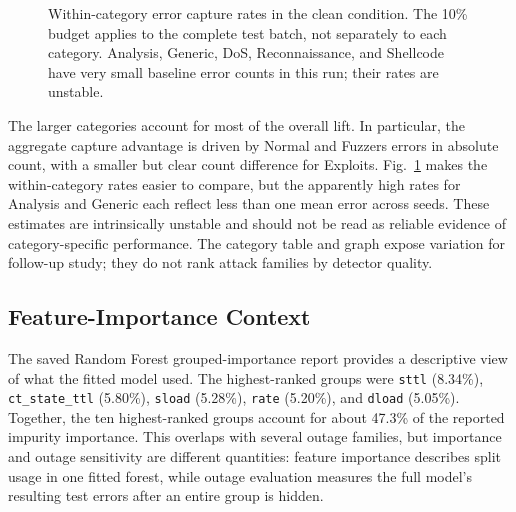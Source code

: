 \documentclass[conference]{IEEEtran}
\begin{document}
\begin{figure}[t]
\centering
{}
\caption{Within-category error capture rates in the clean condition. The 10\% budget applies to the complete test batch, not separately to each category. Analysis, Generic, DoS, Reconnaissance, and Shellcode have very small baseline error counts in this run; their rates are unstable.}
\label{fig:category_capture}
\end{figure}

The larger categories account for most of the overall lift. In particular, the aggregate capture advantage is driven by Normal and Fuzzers errors in absolute count, with a smaller but clear count difference for Exploits. Fig.~\ref{fig:category_capture} makes the within-category rates easier to compare, but the apparently high rates for Analysis and Generic each reflect less than one mean error across seeds. These estimates are intrinsically unstable and should not be read as reliable evidence of category-specific performance. The category table and graph expose variation for follow-up study; they do not rank attack families by detector quality.

\subsection{Feature-Importance Context}
The saved Random Forest grouped-importance report provides a descriptive view of what the fitted model used. The highest-ranked groups were \texttt{sttl} (8.34\%), \texttt{ct\_state\_ttl} (5.80\%), \texttt{sload} (5.28\%), \texttt{rate} (5.20\%), and \texttt{dload} (5.05\%). Together, the ten highest-ranked groups account for about 47.3\% of the reported impurity importance. This overlaps with several outage families, but importance and outage sensitivity are different quantities: feature importance describes split usage in one fitted forest, while outage evaluation measures the full model's resulting test errors after an entire group is hidden.
\end{document}
